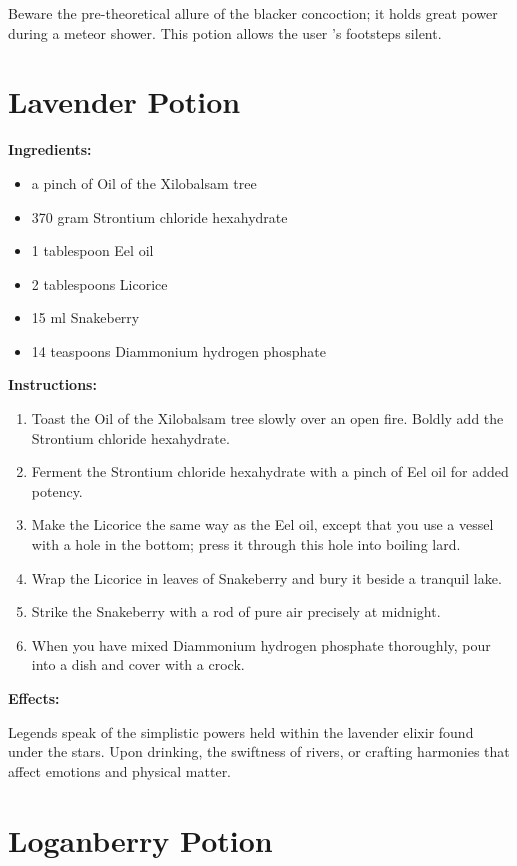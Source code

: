 \documentclass{article}
\begin{document}
Beware the pre-theoretical allure of the blacker concoction; it holds great power during a meteor shower. This potion allows the user 's footsteps silent.

\newpage
\section*{Lavender Potion}

\textbf{Ingredients:}

\begin{itemize}
  \item a pinch of Oil of the Xilobalsam tree
  \item 370 gram Strontium chloride hexahydrate
  \item 1 tablespoon Eel oil
  \item 2 tablespoons Licorice
  \item 15 ml Snakeberry
  \item 14 teaspoons Diammonium hydrogen phosphate
\end{itemize}

\textbf{Instructions:}

\begin{enumerate}
  \item Toast the Oil of the Xilobalsam tree slowly over an open fire. Boldly add the Strontium chloride hexahydrate.
  \item Ferment the Strontium chloride hexahydrate with a pinch of Eel oil for added potency.
  \item Make the Licorice the same way as the Eel oil, except that you use a vessel with a hole in the bottom; press it through this hole into boiling lard.
  \item Wrap the Licorice in leaves of Snakeberry and bury it beside a tranquil lake.
  \item Strike the Snakeberry with a rod of pure air precisely at midnight.
  \item When you have mixed Diammonium hydrogen phosphate thoroughly, pour into a dish and cover with a crock.
\end{enumerate}

\textbf{Effects:}

Legends speak of the simplistic powers held within the lavender elixir found under the stars. Upon drinking, the swiftness of rivers, or crafting harmonies that affect emotions and physical matter.

\newpage
\section*{Loganberry Potion}
\end{document}
